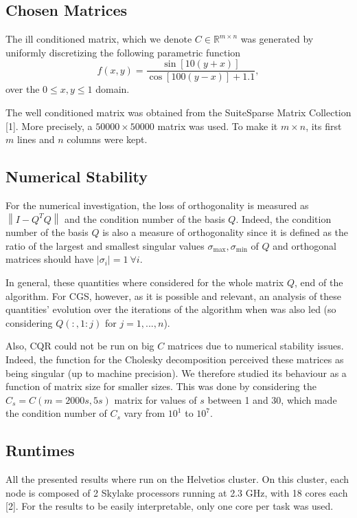 \documentclass[a4paper, 12pt,oneside]{article}
\begin{document}
		\subsection{Chosen Matrices}
			The ill conditioned matrix, which we denote $C \in \mathbb{R}^{m \times n}$ was generated by uniformly discretizing the following parametric function
			$$
			f(x, y)=\frac{\sin [10(y+x)]}{\cos [100(y-x)]+1.1},
			$$
			over the $0 \leq x, y \leq 1$ domain.

			The well conditioned matrix was obtained from the SuiteSparse Matrix Collection [1]. More precisely, a $50000\times 50000$ matrix was used. To make it $m\times n$, its first $m$ lines and $n$ columns were kept. 
		\subsection{Numerical Stability}
			For the numerical investigation, the loss of orthogonality is measured as $\left\|I-Q^T Q\right\|$ and the condition number of the basis $Q$. Indeed, the condition number of the basis $Q$ is also a measure of orthogonality since it is defined as the ratio of the largest and smallest singular values $\sigma_{\max{}},\sigma_{\min}$ of $Q$ and orthogonal matrices should have $|\sigma_i|=1\ \forall i$. 
		
			In general, these quantities where considered for the whole matrix $Q$, end of the algorithm. For CGS, however, as it is possible and relevant, an analysis of these quantities' evolution over the iterations of the algorithm when was also led (so considering $Q(:,1:j)$ for $j=1,...,n$).

			Also, CQR could not be run on big $C$ matrices due to numerical stability issues. Indeed, the function for the Cholesky decomposition perceived these matrices as being singular (up to machine precision). We therefore studied its behaviour as a function of matrix size for smaller sizes. This was done by considering the $C_s=C(m=2000s,5s)$ matrix for values of $s$ between 1 and 30, which made the condition number of $C_s$ vary from $10^1$ to $10^7$.
		\subsection{Runtimes}
			All the presented results where run on the Helvetios cluster. On this cluster, each node is composed of 2 Skylake processors running at 2.3 GHz, with 18 cores each [2]. For the results to be easily interpretable, only one core per task was used.
\end{document}
